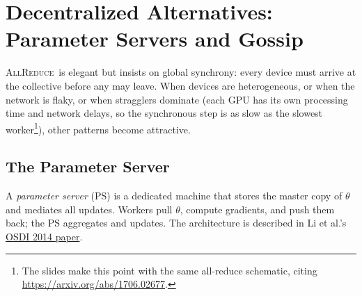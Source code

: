 \documentclass[11pt,a4paper]{article}
\theoremstyle{definition}
\theoremstyle{remark}
\theoremstyle{plain}
\newcommand{\GPU}[1]{\mathrm{GPU}_{#1}}
\newcommand{\grad}{\nabla_{\theta}}
\newcommand{\Loss}{\mathcal{L}}
\newcommand{\allreduce}{\textsc{AllReduce}}
\begin{document}
\section{Decentralized Alternatives: Parameter Servers and Gossip}

\allreduce\ is elegant but insists on global synchrony: every device must
arrive at the collective before any may leave. When devices are
heterogeneous, or when the network is flaky, or when stragglers dominate
(each GPU has its own processing time and network delays, so the
synchronous step is as slow as the slowest worker\footnote{The slides
make this point with the same all-reduce schematic, citing
\url{https://arxiv.org/abs/1706.02677}.}), other patterns become
attractive.

\subsection{The Parameter Server}

A \emph{parameter server} (PS) is a dedicated machine that stores the
master copy of $\theta$ and mediates all updates. Workers pull $\theta$,
compute gradients, and push them back; the PS aggregates and updates. The
architecture is described in Li et al.'s
\href{https://www.cs.cmu.edu/~muli/file/parameter_server_osdi14.pdf}{OSDI
2014 paper}.

\begin{center}
\end{center}
\end{document}

